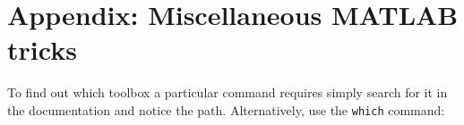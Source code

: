 \section{Appendix: Miscellaneous MATLAB tricks}
To find out which toolbox a particular command requires simply search for it in the documentation and notice the path. Alternatively, use the \lstinline{which} command: